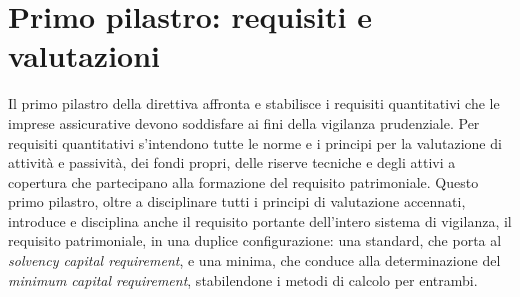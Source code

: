 \section{Primo pilastro: requisiti e valutazioni}
Il primo pilastro della direttiva affronta e stabilisce i requisiti quantitativi che le imprese assicurative devono soddisfare ai fini della vigilanza prudenziale. Per requisiti quantitativi s’intendono tutte le norme e i principi per la valutazione di attività e passività, dei fondi propri, delle riserve tecniche e degli attivi a copertura che partecipano alla formazione del requisito patrimoniale. Questo primo pilastro, oltre a disciplinare tutti i principi di valutazione accennati, introduce e disciplina anche il requisito portante dell’intero sistema di vigilanza, il requisito patrimoniale, in una duplice configurazione: una standard, che porta al {\itshape solvency capital requirement}, e una minima, che conduce alla determinazione del {\itshape minimum capital requirement}, stabilendone i metodi di calcolo per entrambi.

